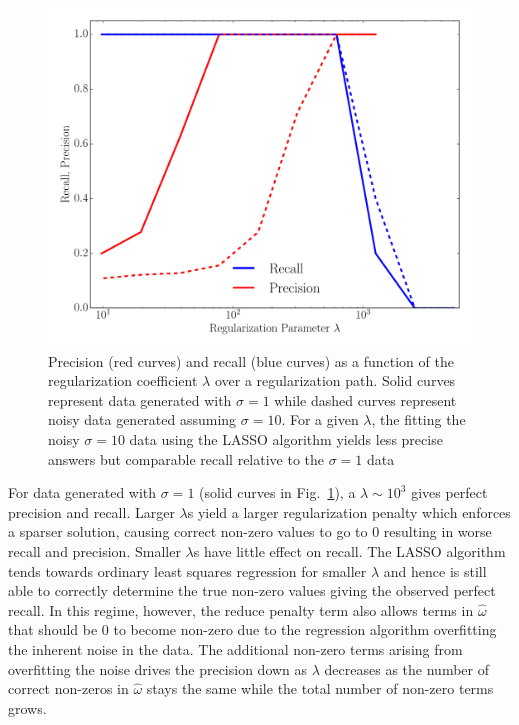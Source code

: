 \documentclass[12pt]{amsart}
\begin{document}
\begin{figure}
	\includegraphics[width=\columnwidth]{synthetic_prec_rec.pdf}
    \caption{Precision (red curves) and recall (blue curves) as a function of the regularization coefficient $\lambda$ over a regularization path.  Solid curves represent data generated with $\sigma = 1$ while dashed curves represent noisy data generated assuming $\sigma = 10$.  For a given $\lambda$, the fitting the noisy $\sigma = 10$ data using the LASSO algorithm yields less precise answers but comparable recall relative to the $\sigma = 1$ data}
    \label{fig:synth_reg}
\end{figure}

For data generated with $\sigma = 1$ (solid curves in Fig.~\ref{fig:synth_reg}), a $\lambda \sim 10^3$ gives perfect precision and recall.  Larger $\lambda$s yield a larger regularization penalty which enforces a sparser solution, causing correct non-zero values to go to 0 resulting in worse recall and precision.  Smaller $\lambda$s have little effect on recall.  The LASSO algorithm tends towards ordinary least squares regression for smaller $\lambda$ and hence is still able to correctly determine the true non-zero values giving the observed perfect recall.  In this regime, however, the reduce penalty term also allows terms in $\hat{\omega}$ that should be 0 to become non-zero due to the regression algorithm overfitting the inherent noise in the data.  The additional non-zero terms arising from overfitting the noise drives the precision down as $\lambda$ decreases as the number of correct non-zeros in $\hat{\omega}$ stays the same while the total number of non-zero terms grows.
\end{document}
